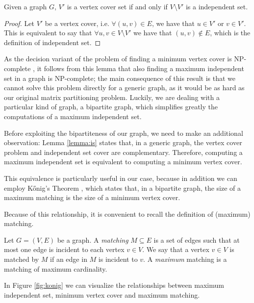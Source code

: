 \begin{lemma} 
	\label{lemma:is}
	Given a graph $G$, $V'$ is a vertex cover set if and only if $V \setminus V'$ is a independent set.
\end{lemma}
\begin{proof}
	Let $V'$ be a vertex cover, i.e. $\forall (u,v) \in E$, we have that $u \in V'$ or $v \in V'$. This is equivalent to say that $\forall u,v \in V \setminus V'$ we have that $(u,v) \notin E$, which is the definition of independent set.
\end{proof}

As the decision variant of the problem of finding a minimum vertex cover is NP-complete \cite[Theorem 3.3]{np_book}, it follows from this lemma that also finding a maximum independent set in a graph is NP-complete; the main consequence of this result is that we cannot solve this problem directly for a generic graph, as it would be as hard as our original matrix partitioning problem. Luckily, we are dealing with a particular kind of graph, a bipartite graph, which simplifies greatly the computations of a maximum independent set.

Before exploiting the bipartiteness of our graph, we need to make an additional observation: Lemma \ref{lemma:is} states that, in a generic graph, the vertex cover problem and independent set cover are complementary. Therefore, computing a maximum independent set is equivalent to computing a minimum vertex cover.

This equivalence is particularly useful in our case, because in addition we can employ K\H{o}nig's Theorem \cite{konig}, which states that, in a bipartite graph, the size of a maximum matching is the size of a minimum vertex cover. 

Because of this relationship, it is convenient to recall the definition of (maximum) matching.

\begin{definition}[Matching]
	Let $G=(V,E)$ be a graph. A \emph{matching} $M \subseteq E$ is a set of edges such that at most one edge is incident to each vertex $v \in V$. We say that a vertex $v \in V$ is matched by $M$ if an edge in $M$ is incident to $v$. A \emph{maximum} matching is a matching of maximum cardinality.
\end{definition}

In Figure \ref{fig:konig} we can visualize the relationships between maximum independent set, minimum vertex cover and maximum matching.

